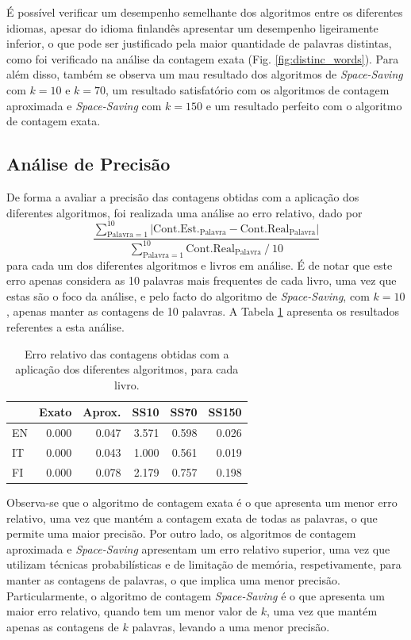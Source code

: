 \documentclass[mirror, portugues]{revdetua}
\begin{document}
É possível verificar um desempenho semelhante dos algoritmos entre os diferentes idiomas, apesar do idioma finlandês apresentar um desempenho ligeiramente inferior, o que pode ser justificado pela maior quantidade de palavras distintas, como foi verificado na análise da contagem exata (Fig. \ref{fig:distinc_words}). Para além disso, também se observa um mau resultado dos algoritmos de \textit{Space-Saving} com $k = 10$ e $k = 70$, um resultado satisfatório com os algoritmos de contagem aproximada e \textit{Space-Saving} com $k = 150$ e um resultado perfeito com o algoritmo de contagem exata.

\subsection{Análise de Precisão}

De forma a avaliar a precisão das contagens obtidas com a aplicação dos diferentes algoritmos, foi realizada uma análise ao erro relativo, dado por
$$
\frac{\sum^{10}_{\text{Palavra} = 1} | \text{Cont.Est.}_{\text{Palavra}} - \text{Cont.Real}_{\text{Palavra}} | }{\sum^{10}_{\text{Palavra} = 1} \text{Cont.Real}_{\text{Palavra}}\ /\ 10}
$$
para cada um dos diferentes algoritmos e livros em análise. É de notar que este erro apenas considera as 10 palavras mais frequentes de cada livro, uma vez que estas são o foco da análise, e pelo facto do algoritmo de \textit{Space-Saving}, com $k = 10$, apenas manter as contagens de 10 palavras. A Tabela \ref{table:erro_relativo} apresenta os resultados referentes a esta análise.

\begin{table}[H]
\centering
\caption{Erro relativo das contagens obtidas com a aplicação dos diferentes algoritmos, para cada livro.}
\label{table:erro_relativo}
\begin{tabular}{lrrrrr}
\toprule
& Exato & Aprox. & SS10 & SS70 & SS150 \\
\midrule
EN & 0.000 & 0.047 & 3.571 & 0.598 & 0.026 \\
IT & 0.000 & 0.043 & 1.000 & 0.561 & 0.019 \\
FI & 0.000 & 0.078 & 2.179 & 0.757 & 0.198 \\
\bottomrule
\end{tabular}
\end{table}

Observa-se que o algoritmo de contagem exata é o que apresenta um menor erro relativo, uma vez que mantém a contagem exata de todas as palavras, o que permite uma maior precisão. Por outro lado, os algoritmos de contagem aproximada e \textit{Space-Saving} apresentam um erro relativo superior, uma vez que utilizam técnicas probabilísticas e de limitação de memória, respetivamente, para manter as contagens de palavras, o que implica uma menor precisão. Particularmente, o algoritmo de contagem \textit{Space-Saving} é o que apresenta um maior erro relativo, quando tem um menor valor de $k$, uma vez que mantém apenas as contagens de $k$ palavras, levando a uma menor precisão.
\end{document}
